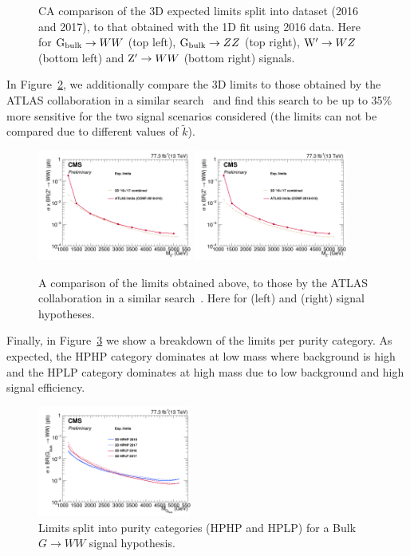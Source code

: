 \begin{figure}[h!]
\caption{CA comparison of the 3D expected limits split into dataset (2016 and 2017), to that obtained with the 1D fit using 2016 data. Here for $\mathrm{G}_\mathrm{bulk}\rightarrow WW$ (top left), $\mathrm{G}_\mathrm{bulk}\rightarrow ZZ$ (top right), $\mathrm{W}^\prime\rightarrow WZ$ (bottom left) and $\mathrm{Z}^\prime\rightarrow WW$ (bottom right) signals.}
\label{fig:limitsCompare}
\end{figure}
In Figure~\ref{fig:limitsCompareATLAS}, we additionally compare the 3D limits to those obtained by the ATLAS collaboration in a similar search~\cite{ATLAS-CONF-2018-016} and find this search to be up to 35\% more sensitive for the two signal scenarios considered (the \BulkG limits can not be compared due to different values of $\tilde{k}$).
\begin{figure}[h!]
\centering
\includegraphics[width=0.45\textwidth]{figures/analysis/search3/AN-17-303/limits/limits_WprimeWZ_compare_ATLAS.png}
\includegraphics[width=0.45\textwidth]{figures/analysis/search3/AN-17-303/limits/limits_ZprimeWW_compare_ATLAS.png}
\caption{A comparison of the limits obtained above, to those by the ATLAS collaboration in a similar search~\cite{ATLAS-CONF-2018-016}. Here for \PWpr (left) and \PZpr (right) signal hypotheses.}
\label{fig:limitsCompareATLAS}
\end{figure}
Finally, in Figure~\ref{fig:limitsPerCat} we show a breakdown of the limits per purity category. As expected, the HPHP category dominates at low mass where background is high and the HPLP category dominates at high mass due to low background and high signal efficiency.
\begin{figure}[h!]
\centering
\includegraphics[width=0.45\textwidth]{figures/analysis/search3/AN-17-303/limits/limit_compare_BulkGWW_per_category.png}
\caption{Limits split into purity categories (HPHP and HPLP) for a Bulk $G\rightarrow WW$ signal hypothesis.}
\label{fig:limitsPerCat}
\end{figure}

